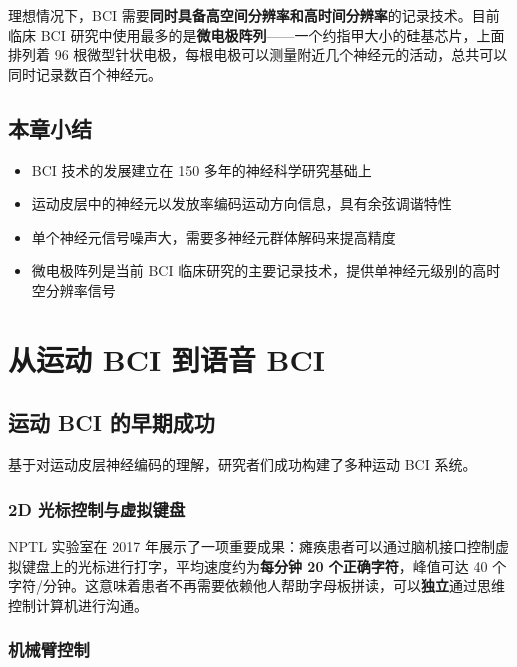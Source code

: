 \documentclass[a4paper]{article}
\begin{document}
理想情况下，BCI 需要\textbf{同时具备高空间分辨率和高时间分辨率}的记录技术。目前临床 BCI 研究中使用最多的是\textbf{微电极阵列}——一个约指甲大小的硅基芯片，上面排列着 96 根微型针状电极，每根电极可以测量附近几个神经元的活动，总共可以同时记录数百个神经元。

\subsection{本章小结}

\begin{itemize}
    \item BCI 技术的发展建立在 150 多年的神经科学研究基础上
    \item 运动皮层中的神经元以发放率编码运动方向信息，具有余弦调谐特性
    \item 单个神经元信号噪声大，需要多神经元群体解码来提高精度
    \item 微电极阵列是当前 BCI 临床研究的主要记录技术，提供单神经元级别的高时空分辨率信号
\end{itemize}


\section{从运动 BCI 到语音 BCI}

\subsection{运动 BCI 的早期成功}

基于对运动皮层神经编码的理解，研究者们成功构建了多种运动 BCI 系统。




\subsubsection{2D 光标控制与虚拟键盘}

NPTL 实验室在 2017 年展示了一项重要成果：瘫痪患者可以通过脑机接口控制虚拟键盘上的光标进行打字，平均速度约为\textbf{每分钟 20 个正确字符}，峰值可达 40 个字符/分钟。这意味着患者不再需要依赖他人帮助字母板拼读，可以\textbf{独立}通过思维控制计算机进行沟通。

\subsubsection{机械臂控制}
\end{document}
